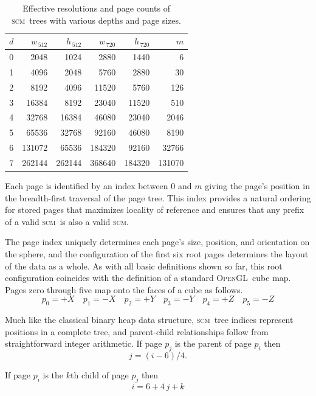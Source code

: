 \documentclass[oneside,11pt]{memoir}
\newcommand{\opengl}  {\textsc{OpenGL}}
\newcommand{\scm}     {\textsc{scm}}
\newcommand{\B}{\bigstrut[b]}
\newcommand{\T}{\bigstrut[t]}
\begin{document}
\begin{Spacing}{1.1}
\begin{table}
  \centering
  \label{tab:resolution}
  \begin{tabular}{r|rr|rr|r}
  $d$& $w_{\,512}$& $h_{\,512}$& $w_{\,720}$& $h_{\,720}$& $m$ \B\\\hline
  \num{0}&  \num{2048}&  \num{1024}&  \num{2880}&  \num{1440}&     \num{6} \T\\
  \num{1}&  \num{4096}&  \num{2048}&  \num{5760}&  \num{2880}&    \num{30} \\
  \num{2}&  \num{8192}&  \num{4096}& \num{11520}&  \num{5760}&   \num{126} \\
  \num{3}& \num{16384}&  \num{8192}& \num{23040}& \num{11520}&   \num{510} \\
  \num{4}& \num{32768}& \num{16384}& \num{46080}& \num{23040}&  \num{2046} \\
  \num{5}& \num{65536}& \num{32768}& \num{92160}& \num{46080}&  \num{8190} \\
  \num{6}&\num{131072}& \num{65536}&\num{184320}& \num{92160}& \num{32766} \\
  \num{7}&\num{262144}&\num{262144}&\num{368640}&\num{184320}&\num{131070} \\
  \end{tabular}
  \caption{Effective resolutions and page counts of \scm\ trees with various depths and page sizes.}
\end{table}

Each page is identified by an index between $0$ and $m$ giving the page's position in the breadth-first traversal of the page tree. This index provides a natural ordering for stored pages that maximizes locality of reference and ensures that any prefix of a valid \scm\ is also a valid \scm.

The page index uniquely determines each page's size, position, and orientation on the sphere, and the configuration of the first six root pages determines the layout of the data as a whole. As with all basic definitions shown so far, this root configuration coincides with the definition of a standard \opengl\ cube map. Pages zero through five map onto the faces of a cube as follows.
\[p_0=+X\quad p_1=-X\quad p_2=+Y\quad p_3=-Y\quad p_4=+Z\quad p_5=-Z\]

Much like the classical binary heap data structure, \scm\ tree indices represent positions in a complete tree, and parent-child relationships follow from straightforward integer arithmetic. If page $p_j$ is the parent of page $p_i$ then
\[j=(i-6)/4.\]

If page $p_i$ is the $k$th child of page $p_j$ then
\[i=6+4\,j+k\]


\end{Spacing}
\end{document}
